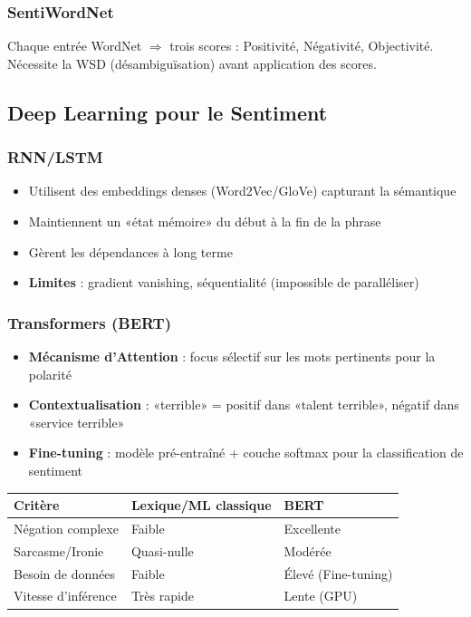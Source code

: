 \documentclass[a4paper,10pt]{article}
\begin{document}
\subsubsection{SentiWordNet}
Chaque entrée WordNet $\Rightarrow$ trois scores : Positivité, Négativité, Objectivité.
Nécessite la WSD (désambiguïsation) avant application des scores.

\subsection{Deep Learning pour le Sentiment}

\subsubsection{RNN/LSTM}
\begin{itemize}
  \item Utilisent des embeddings denses (Word2Vec/GloVe) capturant la sémantique
  \item Maintiennent un «état mémoire» du début à la fin de la phrase
  \item Gèrent les dépendances à long terme
  \item \textbf{Limites} : gradient vanishing, séquentialité (impossible de paralléliser)
\end{itemize}

\subsubsection{Transformers (BERT)}
\begin{itemize}
  \item \textbf{Mécanisme d'Attention} : focus sélectif sur les mots pertinents pour la polarité
  \item \textbf{Contextualisation} : «terrible» = positif dans «talent terrible», négatif dans «service terrible»
  \item \textbf{Fine-tuning} : modèle pré-entraîné + couche softmax pour la classification de sentiment
\end{itemize}

\begin{center}
\small
\begin{tabular}{lll}
\toprule
\textbf{Critère} & \textbf{Lexique/ML classique} & \textbf{BERT} \\
\midrule
Négation complexe & Faible & Excellente \\
Sarcasme/Ironie & Quasi-nulle & Modérée \\
Besoin de données & Faible & Élevé (Fine-tuning) \\
Vitesse d'inférence & Très rapide & Lente (GPU) \\
\bottomrule
\end{tabular}
\end{center}
\end{document}
